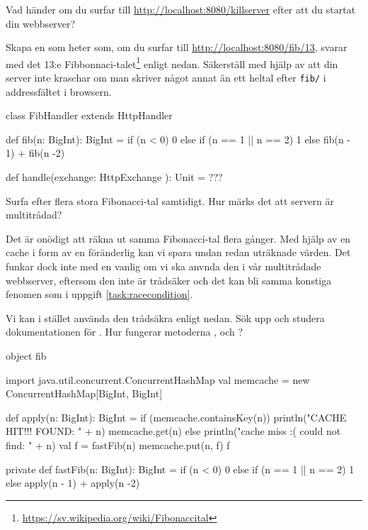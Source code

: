 
\Subtask Vad händer om du surfar till \url{http://localhost:8080/killserver} efter att du startat din webbserver?

\Subtask Skapa en  som heter  som, om du surfar till  \url{http://localhost:8080/fib/13}, svarar med det 13:e Fibbonnaci-talet\footnote{\href{https://sv.wikipedia.org/wiki/Fibonaccital}{https://sv.wikipedia.org/wiki/Fibonaccital}} enligt nedan. Säkerställ med hjälp av  att din server inte kraschar om man skriver något annat än ett heltal efter \texttt{fib/} i addressfältet i browsern.

\begin{Code}
class FibHandler extends HttpHandler {
  def fib(n: BigInt): BigInt = {
    if (n < 0) 0 else 
    if (n == 1 || n == 2) 1  
    else fib(n - 1) + fib(n -2)
  }
  
  def handle(exchange: HttpExchange ): Unit = ???
}
\end{Code} 


\Subtask Surfa efter flera stora Fibonacci-tal samtidigt. Hur märks det att servern är multitrådad?

\Subtask Det är onödigt att räkna ut samma Fibonacci-tal flera gånger. Med hjälp av en cache i form av en föränderlig  kan vi spara undan redan uträknade värden. Det funkar dock inte med en vanlig  om vi ska anvnda den i vår multitrådade webbserver, eftersom den inte är trådsäker och det kan bli samma konstiga fenomen som i uppgift \ref{task:racecondition}. 

Vi kan i stället använda den trådsäkra  enligt nedan. Sök upp och studera dokumentationen för . Hur fungerar metoderna ,  och ?
\begin{Code}
object fib {
  import java.util.concurrent.ConcurrentHashMap
  val memcache = new ConcurrentHashMap[BigInt, BigInt]
  
  def apply(n: BigInt): BigInt = 
    if (memcache.containsKey(n)) { 
      println("CACHE HIT!!! FOUND: " + n)
      memcache.get(n)
    } else {
      println("cache miss :( could not find: " + n)
      val f = fastFib(n)
      memcache.put(n, f)
      f
    }
  
  private def fastFib(n: BigInt): BigInt = {
    if (n < 0) 0 else 
    if (n == 1 || n == 2) 1  
    else apply(n - 1) + apply(n -2)
  }
}
\end{Code}
 
